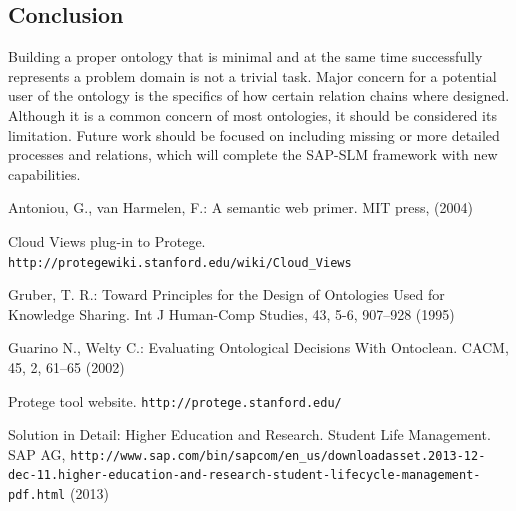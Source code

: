 \documentclass{article}    %
\begin{document}
\subsection{Conclusion}
%
Building a proper ontology that is minimal and at the same time successfully represents a problem domain is not a trivial task. Major concern for a potential user of the ontology is the specifics of how certain relation chains where designed. Although it is a common concern of most ontologies, it should be considered its limitation. Future work should be focused on including missing or more detailed processes and relations, which will complete the SAP-SLM framework with new capabilities.
%
%
\begin{thebibliography}{99}
%
Antoniou, G., van Harmelen, F.:
A semantic web primer. 
MIT press, (2004)

Cloud Views plug-in to Protege.
\texttt{http://protegewiki.stanford.edu/\newline wiki/Cloud\_Views}

Gruber, T. R.:
Toward Principles for the Design of Ontologies Used for Knowledge Sharing. 
Int J Human-Comp Studies, 43, 5-6, 907--928 (1995)

Guarino N., Welty C.:
Evaluating Ontological Decisions With Ontoclean.
CACM, 45, 2, 61--65 (2002)

Protege tool website.
\texttt{http://protege.stanford.edu/}

Solution in Detail: Higher Education and Research. Student Life Management.
SAP AG, \texttt{http://www.sap.com/bin/sapcom/en\_us/downloadasset.2013-12-dec-11.higher-education-and-research-student-lifecycle-\newline management-pdf.html} (2013)

\end{thebibliography}
\end{document}
